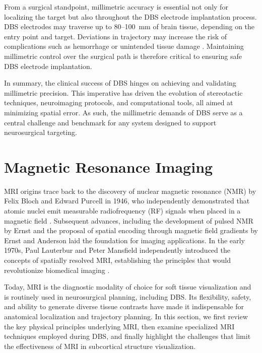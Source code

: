 From a surgical standpoint, millimetric accuracy is essential not only for localizing the target but also throughout the DBS electrode implantation process. DBS electrodes may traverse up to 80–100~mm of brain tissue, depending on the entry point and target. Deviations in trajectory may increase the risk of complications such as hemorrhage or unintended tissue damage \cite{Ben-Haim2009-os,Rajabian2023-st}. Maintaining millimetric control over the surgical path is therefore critical to ensuring safe DBS electrode implantation.
 
In summary, the clinical success of DBS hinges on achieving and validating millimetric precision. This imperative has driven the evolution of stereotactic techniques, neuroimaging protocols, and computational tools, all aimed at minimizing spatial error. As such, the millimetric demands of DBS serve as a central challenge and benchmark for any system designed to support neurosurgical targeting.

\section{Magnetic Resonance Imaging}
\label{sec:MRI}
MRI origins trace back to the discovery of nuclear magnetic resonance (NMR) by Felix Bloch and Edward Purcell in 1946, who independently demonstrated that atomic nuclei emit measurable radiofrequency (RF) signals when placed in a magnetic field \cite{Bloch1946-ob, Purcell1946-jd}. Subsequent advances, including the development of pulsed NMR by Ernst \cite{Ernst1990-we} and the proposal of spatial encoding through magnetic field gradients by Ernst and Anderson \cite{Ernst1966-yx} laid the foundation for imaging applications. In the early 1970s, Paul Lauterbur and Peter Mansfield independently introduced the concepts of spatially resolved MRI, establishing the principles that would revolutionize biomedical imaging \cite{Lauterbur1973-wf,Mansfield1977-ru}. 

Today, MRI is the diagnostic modality of choice for soft tissue visualization and is routinely used in neurosurgical planning, including DBS. Its flexibility, safety, and ability to generate diverse tissue contrasts have made it indispensable for anatomical localization and trajectory planning. In this section, we first review the key physical principles underlying MRI, then examine specialized MRI techniques employed during DBS, and finally highlight the challenges that limit the effectiveness of MRI in subcortical structure visualization.

